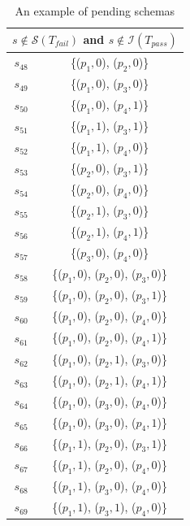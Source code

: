 \begin{table}[htbp]
  \centering
  \caption{An example of pending schemas}
  \label{ex:pendingschemas}
    \begin{tabular}{|c|c|} \hline
     \multicolumn{2}{|c|}{\textbf{$s \not\in \mathcal{S}(T_{fail})$ and $s \not\in \mathcal{I}(T_{pass})$}} \\ \hline
  $s_{48}$ & \{($p_{1}, 0$), ($p_{2}, 0$)\}\\
  $s_{49}$ & \{($p_{1}, 0$), ($p_{3}, 0$)\}\\
  $s_{50}$ & \{($p_{1}, 0$), ($p_{4}, 1$)\}\\

  $s_{51}$ & \{($p_{1}, 1$), ($p_{3}, 1$)\}\\
  $s_{52}$ & \{($p_{1}, 1$), ($p_{4}, 0$)\}\\

  $s_{53}$ & \{($p_{2}, 0$), ($p_{3}, 1$)\}\\
  $s_{54}$ & \{($p_{2}, 0$), ($p_{4}, 0$)\}\\

  $s_{55}$ & \{($p_{2}, 1$), ($p_{3}, 0$)\}\\
  $s_{56}$ & \{($p_{2}, 1$), ($p_{4}, 1$)\}\\

  $s_{57}$ & \{($p_{3}, 0$), ($p_{4}, 0$)\}\\

  $s_{58}$ & \{($p_{1}, 0$), ($p_{2}, 0$), ($p_{3}, 0$)\}\\
  $s_{59}$ & \{($p_{1}, 0$), ($p_{2}, 0$), ($p_{3}, 1$)\}\\
  $s_{60}$ & \{($p_{1}, 0$), ($p_{2}, 0$), ($p_{4}, 0$)\}\\
  $s_{61}$ & \{($p_{1}, 0$), ($p_{2}, 0$), ($p_{4}, 1$)\}\\

  $s_{62}$ & \{($p_{1}, 0$), ($p_{2}, 1$), ($p_{3}, 0$)\}\\
  $s_{63}$ & \{($p_{1}, 0$), ($p_{2}, 1$), ($p_{4}, 1$)\}\\

  $s_{64}$ & \{($p_{1}, 0$), ($p_{3}, 0$), ($p_{4}, 0$)\}\\
  $s_{65}$ & \{($p_{1}, 0$), ($p_{3}, 0$), ($p_{4}, 1$)\}\\


  $s_{66}$ & \{($p_{1}, 1$), ($p_{2}, 0$), ($p_{3}, 1$)\}\\
  $s_{67}$ & \{($p_{1}, 1$), ($p_{2}, 0$), ($p_{4}, 0$)\}\\
  $s_{68}$ & \{($p_{1}, 1$), ($p_{3}, 0$), ($p_{4}, 0$)\}\\
  $s_{69}$ & \{($p_{1}, 1$), ($p_{3}, 1$), ($p_{4}, 0$)\}\\


\end{tabular}
\end{table}
